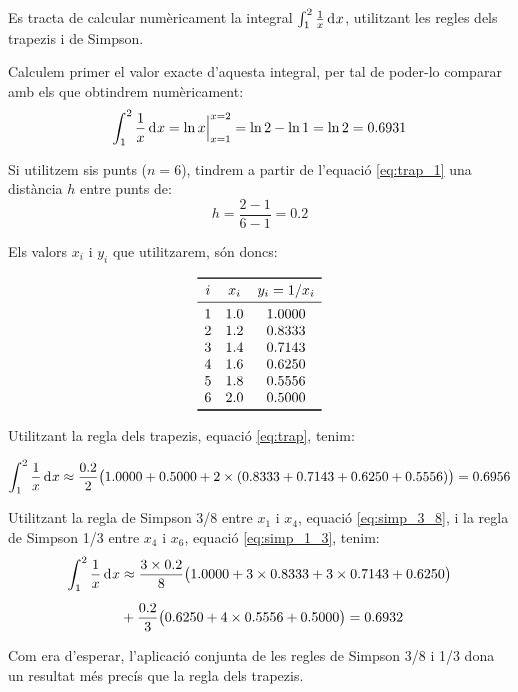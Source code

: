 \begin{exemple}
    Es tracta de calcular numèricament la integral $\int_1^2 \frac{1}{x} \diff x$, utilitzant les regles dels trapezis i de Simpson.

    Calculem primer el valor exacte d'aquesta integral, per tal de poder-lo comparar amb els que obtindrem  numèricament:
    \[
      \int_1^2 \frac{1}{x} \diff x = \ln x \Bigr|_{x=1}^{x=2} = \ln 2 - \ln 1 = \ln 2 = \num{0,6931}
    \]

    Si utilitzem sis punts ($n=6$), tindrem a partir de l'equació \eqref{eq:trap_1} una distància $h$ entre punts de:
    \[
        h = \frac{2-1}{6-1} = \num{0,2}
    \]

    Els valors $x_i$ i $y_i$ que utilitzarem, són doncs:
    \vspace{-8mm}
    \begin{center}
        \[\begin{array}{ccc}
           \toprule[1pt]
              i & x_i  & y_i = 1/x_i \\
           \midrule
              1 & \num{1,0} & \num{1,0000} \\
              2 & \num{1,2} & \num{0,8333} \\
              3 & \num{1,4} & \num{0,7143} \\
              4 & \num{1,6} & \num{0.6250} \\
              5 & \num{1,8} & \num{0.5556} \\
              6 & \num{2,0} & \num{0,5000} \\
           \bottomrule[1pt]
        \end{array} \]
    \end{center}

    \pagebreak
    Utilitzant la regla dels trapezis, equació \eqref{eq:trap}, tenim:

    \[
        \int_1^2 \frac{1}{x} \diff x \approx \frac{\num{0,2}}{2} \big(\num{1,0000}+\num{0,5000} +2 \times(\num{0,8333}+ \num{0,7143} +
        \num{0,6250} + \num{0,5556}) \big) = \num{0,6956}
    \]

    Utilitzant la regla de Simpson 3/8 entre $x_1$ i $x_4$, equació \eqref{eq:simp_3_8}, i la  regla de Simpson 1/3 entre $x_4$ i $x_6$, equació \eqref{eq:simp_1_3}, tenim:
    \[\begin{split}
        \int_1^2 \frac{1}{x} \diff x &\approx \frac{3\times\num{0,2}}{8} \big(\num{1,0000}+3\times\num{0,8333} +3\times \num{0,7143} +
        \num{0,6250} \big) \\[0.5em]
        {}&+ \frac{\num{0,2}}{3} \big(\num{0,6250} +4\times \num{0,5556} + \num{0,5000} \big)
        = \num{0,6932}
    \end{split}\]

    Com era d'esperar, l'aplicació conjunta de les regles de Simpson 3/8 i 1/3 dona un resultat més precís que la regla dels trapezis.
\end{exemple}


